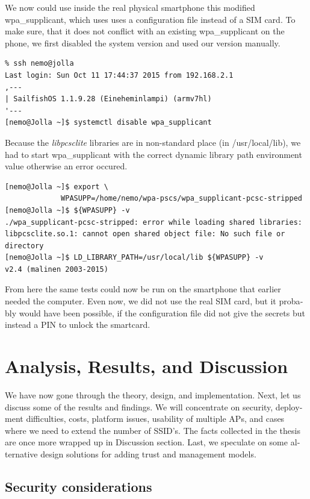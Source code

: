 \documentclass[12pt,a4paper,english]{tutthesis}
\begin{document}
\begin{otherlanguage}{english}
We now could use inside the real physical smartphone this modified
wpa\_supplicant, which uses uses a configuration file instead of a SIM card.  To make
sure, that it does not conflict with an existing wpa\_supplicant on the phone,
we first disabled the system version and used our version manually.

\begin{verbatim}
% ssh nemo@jolla
Last login: Sun Oct 11 17:44:37 2015 from 192.168.2.1
,---
| SailfishOS 1.1.9.28 (Eineheminlampi) (armv7hl)
'---
[nemo@Jolla ~]$ systemctl disable wpa_supplicant
\end{verbatim}

Because the \emph{libpcsclite} libraries are in non-standard
place (in /usr/local/lib), we had to start wpa\_supplicant with the correct
dynamic library path environment value otherwise an error occured.


\begin{verbatim}
[nemo@Jolla ~]$ export \
             WPASUPP=/home/nemo/wpa-pscs/wpa_supplicant-pcsc-stripped
[nemo@Jolla ~]$ ${WPASUPP} -v
./wpa_supplicant-pcsc-stripped: error while loading shared libraries:
libpcsclite.so.1: cannot open shared object file: No such file or 
directory
[nemo@Jolla ~]$ LD_LIBRARY_PATH=/usr/local/lib ${WPASUPP} -v
v2.4 (malinen 2003-2015)
\end{verbatim}
From here the same tests could now be run on the smartphone that
earlier needed the computer. Even now, we did not use the real SIM card, but it
probably would have been possible, if the configuration file did not give
the secrets but instead a PIN to unlock the smartcard.

\chapter{Analysis, Results, and Discussion}
\label{sec-6}

We have now gone through the theory, design, and implementation. Next,
let us
discuss some of the results and findings. We will concentrate on security, 
deployment difficulties, costs, platform issues, usability of multiple
APs, and cases where we
need to extend the number of SSID's. The facts collected in the thesis
are once more wrapped up in Discussion section.
Last, we speculate on some alternative design solutions for adding
trust and management models.


\section{Security considerations}
\label{sec-6-1}




\end{otherlanguage}
\end{document}
